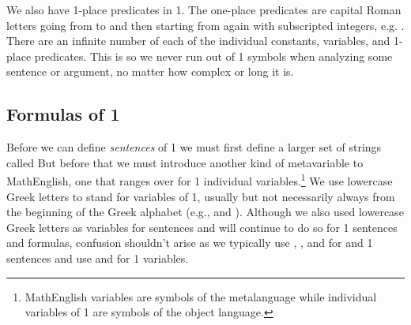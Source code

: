 We also have 1-place predicates in \GQL{}1. The one-place predicates are capital Roman letters going from  to  and then starting from  again with subscripted integers, e.g. .  There are an infinite number of each of the individual constants, variables, and 1-place predicates. 
This is so we never run out of \GQL{}1 symbols when analyzing some sentence or argument, no matter how complex or long it is.

\subsection{Formulas of \GQL{}1}\label{Formulas of GQL1}
Before we can define \emph{sentences} of \GQL{}1 we must first define a larger set of strings called  
But before that we must introduce another kind of metavariable to MathEnglish, one that ranges over for \GQL{}1 individual variables.\footnote{MathEnglish variables are symbols of the metalanguage while individual variables of \GQL{}1 are symbols of the object language.} 
We use lowercase Greek letters to stand for variables of \GQL{}1, usually but not necessarily always from the beginning of the Greek alphabet (e.g., \mention{$\ALPHA$} and \mention{$\BETA$}). Although we also used lowercase Greek letters as variables for \GSL{} sentences and will continue to do so for \GQL{}1 sentences and formulas, confusion shouldn't arise as we typically use \mention{$\CAPPHI$}, \mention{$\CAPPSI$}, and \mention{$\CAPTHETA$} for \GSL{} and \GQL{}1 sentences and use \mention{$\ALPHA$} and \mention{$\BETA$} for \GQL{}1 variables. 
